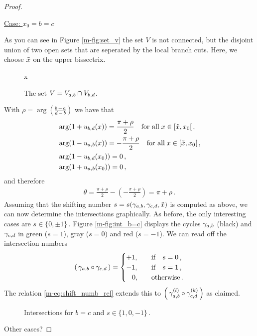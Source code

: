 \documentclass[main.tex]{subfiles}
\begin{document}
\begin{proof}
\begin{itemize}
  \begin{center}
   \underline{Case: $x_0 = b = c$}
  \end{center}
  As you can see in Figure \ref{m-fig:set_v} the set $V$ is not connected, but the disjoint union of two open sets that are seperated by the local branch cuts. Here, we choose $\tilde{x}$ on the upper bissectrix.
   \begin{figure}[H]
      \begin{center}
	  
      \end{center}x
    \caption{The set $V = V_{a,b} \cap V_{b,d}$.}
    \label{fig:set_v}
\end{figure}
  With $\rho = \arg\left(\frac{b-a}{d-b}\right)$ we have that
  \begin{align*}
   & \arg (1+u_{b,d}(x)) = \frac{\pi+\rho}{2} \quad \text{for all} \; x \in [\tilde{x},x_0[\,,\\
   & \arg (1-u_{a,b}(x)) = -\frac{\pi+\rho}{2} \quad \text{for all} \; x \in [\tilde{x},x_0[\,,\\
   & \arg (1-u_{b,d}(x_0)) = 0\,,\\ 
   & \arg (1+u_{a,b}(x_0))= 0\,,
  \end{align*}
  and therefore 
  \begin{align*}
   \theta = \frac{\pi+\rho}{2} - \left(-\frac{\pi+\rho}{2}\right) = \pi + \rho\,.
  \end{align*}
  Assuming that the shifting number $s=s(\gamma_{a,b},\gamma_{c,d},\tilde{x})$ is computed as above, we can now determine the intersections graphically. \abstandl
  As before, the only interesting cases
  are $s \in \{0,\pm 1\}$\,. Figure \ref{m-fig:int_b=c} displays the cycles $\gamma_{a,b}$ (black) and $\gamma_{c,d}$ in green ($s=1$), gray ($s=0$) and red ($s=-1$). 
  We can read off the intersection numbers
  \begin{align*}
    \left(\,\gamma_{a,b} \circ \gamma_{c,d}\,\right) = \begin{cases}
                                          +1, \quad & \text{if} \quad s=0\,,\\
                                          -1, \quad & \text{if} \quad s=1\,,\\
                                          \quad\!0, \quad & \text{otherwise}\,.
                                         \end{cases}
  \end{align*}
  The relation \eqref{m-eq:shift_numb_rel} extends this to $\left(\,\gamma_{a,b}^{(l)} \circ \gamma_{c,d}^{(k)}\,\right)$ as claimed. 
  \begin{figure}[H]
      \begin{center}
	  
      \end{center}
    \caption{Intersections for $b=c$ and $s \in \{1,0,-1\}$\,.}
    \label{fig:int_b=c}
\end{figure}
	\end{itemize}
	\todo Other cases?
  \end{proof}
	
\end{document}

